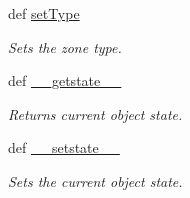 \begin{DoxyCompactItemize}
def \hyperlink{class_zone_1_1_zone_ac7a6784a59c79ac76d44099c8a036c75}{set\-Type}
\begin{DoxyCompactList}\small\item\em \-Sets the zone type. \end{DoxyCompactList}\item 
def \hyperlink{class_zone_1_1_zone_a9d1df98f168b5db35573a75bd4b0d2ce}{\-\_\-\-\_\-getstate\-\_\-\-\_\-}
\begin{DoxyCompactList}\small\item\em \-Returns current object state. \end{DoxyCompactList}\item 
def \hyperlink{class_zone_1_1_zone_a08f429d8cb33b2f13e34d945168a079c}{\-\_\-\-\_\-setstate\-\_\-\-\_\-}
\begin{DoxyCompactList}\small\item\em \-Sets the current object state. \end{DoxyCompactList}\end{DoxyCompactItemize}
